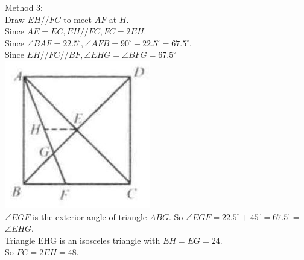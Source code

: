 \documentclass{article}
\begin{document}
Method 3:\\
Draw \(E H / / F C\) to meet \(A F\) at \(H\).\\
Since \(A E=E C, E H / / F C, F C=2 E H\).\\
Since \(\angle B A F=22.5^{\circ}, \angle A F B=90^{\circ}-22.5^{\circ}=67.5^{\circ}\).\\
Since \(E H / / F C / / B F, \angle E H G=\angle B F G=67.5^{\circ}\)\\
\centering
\includegraphics[width=\textwidth]{images/110.jpg}\\
\(\angle E G F\) is the exterior angle of triangle \(A B G\). So \(\angle E G F=22.5^{\circ}+45^{\circ}=67.5^{\circ}=\) \(\angle E H G\).\\
Triangle EHG is an isosceles triangle with \(E H=E G=24\).\\
So \(F C=2 E H=48\).\\
\end{document}
